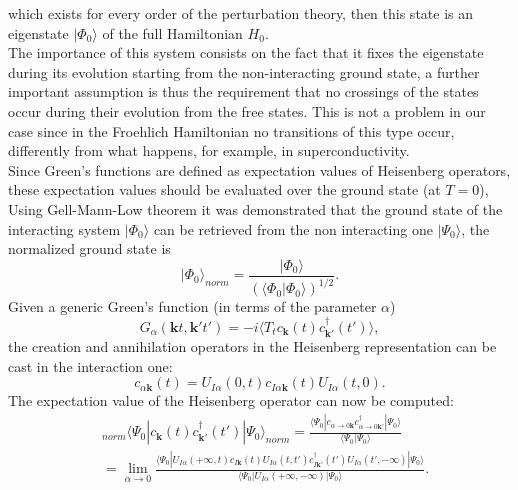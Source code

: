 which exists for every order of the perturbation theory, then this state is an eigenstate $|\Phi_0\rangle$ of the full Hamiltonian $H_0$.\\
The importance of this system consists on the fact that it fixes the eigenstate during its evolution starting from the non-interacting ground 
state, a further important assumption is thus the requirement that no crossings of the states occur during their evolution from the free states. This is not 
a problem in our case since in the Froehlich Hamiltonian no transitions of this type occur, differently from what happens, for example, 
in superconductivity.\\
Since Green's functions are defined as expectation values of Heisenberg operators, these expectation values should be evaluated over the ground state (at $T=0$), 
Using Gell-Mann-Low theorem it was demonstrated that the ground state of the interacting system $|\Phi_0\rangle$ can be retrieved from the non interacting one $|\Psi_0\rangle$, 
the normalized ground state is
\begin{equation}
    |\Phi_0\rangle_{norm}=\frac{|\Phi_0\rangle}{\left(\langle \Phi_0|\Phi_0\rangle\right)^{1/2}}.
\end{equation}
Given a generic Green's function (in terms of the parameter $\alpha$)
\begin{equation}
    G_\alpha(\mathbf{k}t,\mathbf{k}'t')=-i\langle T_t c_{\mathbf{k}}(t)c^\dagger_{\mathbf{k}'}(t')\rangle,
\end{equation}
the creation and annihilation operators in the Heisenberg representation can be cast in the interaction one:
\begin{equation}
    c_{\alpha\mathbf{k}}(t)=U_{I\alpha}(0,t)c_{I\alpha\mathbf{k}}(t)U_{I\alpha}(t,0).
\end{equation}
The expectation value of the Heisenberg operator can now be computed:
\begin{equation}
\begin{split}
    &_{norm}\langle \Psi_0|c_{\mathbf{k}}(t)c^\dagger_{\mathbf{k}'}(t')|\Psi_0\rangle_{norm}=\frac{\langle\Psi_0|c_{\alpha\to0\mathbf{k}}c^\dagger_{\alpha\to0\mathbf{k}'}|\Psi_0\rangle}{\langle\Psi_0|\Psi_0\rangle}\\
    &=\lim_{\alpha\to0}\frac{\langle\Psi_0|U_{I\alpha}(+\infty,t)c_{I\mathbf{k}}(t)U_{I\alpha}(t,t')c^\dagger_{I\mathbf{k}'}(t')U_{I\alpha}(t',-\infty)|\Psi_0\rangle}{\langle\Psi_0|U_{I\alpha}(+\infty,-\infty)|\Psi_0\rangle}.
\end{split}
\end{equation}
